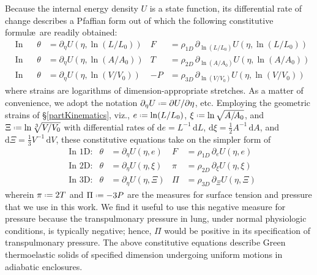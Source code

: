 Because the internal energy density $U$ is a state function, its differential rate of change describes a Pfaffian form \cite{Caratheodory09} out of which the following constitutive formul\ae\ are readily obtained:
\begin{subequations}
    \label{GreenElasticCEs}
    \begin{align}
    \mbox{} & \text{In 1D:} & 
    \theta & = \partial_{\eta} U ( \eta , \ln (L/L_0)) &
    F & = \rho_{1D} \, \partial_{\ln(L/L_0)} U ( \eta , \ln (L/L_0) ) \\
    \mbox{} & \text{In 2D:} &
    \theta & = \partial_{\eta} U ( \eta , \ln (A / \! A_0) ) &
    T & = \rho_{2D} \, \partial_{\ln (A / \! A_0)} U ( \eta , \ln (A / A_0) ) \\
    \mbox{} & \text{In 3D:} &
    \theta & = \partial_{\eta} U ( \eta , \ln (V \! / V_0) ) &
    -P & = \rho_{3D} \, \partial_{\ln (V \! / V_0)} U ( \eta , \ln (V \! / V_0) )
    \end{align}
\end{subequations}
where strains are logarithms of dimension-appropriate stretches.  As a matter of convenience, we adopt the notation $\partial_{\eta} U \defeq \partial U / \partial \eta$, etc.  Employing the geometric strains of \S\ref{partKinematics}, viz., $e \defeq \ln ( L / L_0 )$, $\xi \defeq \ln \sqrt{ A / \! A_0 }$, and $\Xi \defeq \ln \sqrt[3]{V \! / V_0}$ with differential rates of $\mathrm{d} e = L^{-1} \, \mathrm{d}L$, $\mathrm{d} \xi = \tfrac{1}{2} A^{-1} \, \mathrm{d}A$, and $\mathrm{d} \Xi = \tfrac{1}{3} V^{-1} \, \mathrm{d}V$, these constitutive equations take on the simpler form of
\begin{subequations}
    \label{uniformCEs}
    \begin{align}
    \mbox{} & \text{In 1D:} & 
    \theta & = \partial_{\eta} U ( \eta , e) &
    F & = \rho_{1D} \, \partial_e U ( \eta , e ) \\
    \mbox{} & \text{In 2D:} &
    \theta & = \partial_{\eta} U ( \eta , \xi ) &
    \pi & = \rho_{2D} \, \partial_{\xi} U ( \eta , \xi ) \\
    \mbox{} & \text{In 3D:} &
    \theta & = \partial_{\eta} U ( \eta , \Xi ) &
    \Pi & = \rho_{3D} \, \partial_{\Xi} U ( \eta , \Xi )
    \end{align}
\end{subequations}
wherein $\pi \defeq 2T$ and $\Pi \defeq -3P$ are the measures for surface tension and pressure that we use in this work.  We find it useful to use this negative measure for pressure because the transpulmonary pressure in lung, under normal physiologic conditions, is typically negative; hence, $\Pi$ would be positive in its specification of transpulmonary pressure.  The above constitutive equations describe Green thermo\-elastic solids of specified dimension undergoing uniform motions in adiabatic enclosures.

